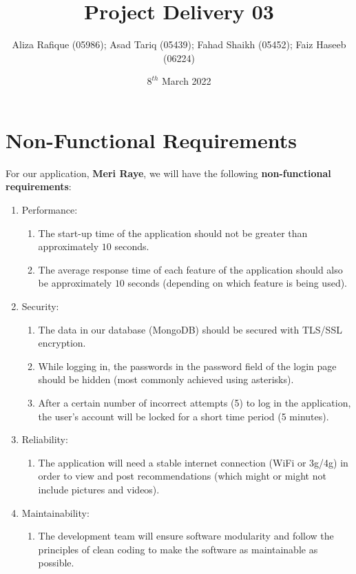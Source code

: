 \documentclass[11pt]{extarticle}
\title{\textbf{Project Delivery 03}}
\author{Aliza Rafique (05986); Asad Tariq (05439); Fahad Shaikh (05452); Faiz Haseeb (06224)}
\date{$8^{th}$ March 2022}
\begin{document}

\newpage
\thispagestyle{empty}
\tableofcontents
\newpage
\pagestyle{plain}

\section{Non-Functional Requirements}
\justify
For our application, \textbf{Meri Raye}, we will have the following \textbf{non-functional requirements}:

\begin{enumerate}
    \item Performance:
                    \begin{enumerate}[label=(\alph*)]
                        \item The start-up time of the application should not be greater than approximately $10$ seconds.
                        \item The average response time of each feature of the application should also be approximately $10$ seconds (depending on which feature is being used).
                    \end{enumerate}
    \item Security:
                    \begin{enumerate}[label=(\alph*)]
                        \item The data in our database (MongoDB) should be secured with TLS/SSL encryption.
                        \item While logging in, the passwords in the password field of the login page should be hidden (most commonly achieved using asterisks).
                        \item After a certain number of incorrect attempts (5) to log in the application, the user's account will be locked for a short time period (5 minutes).
                    \end{enumerate}
    \item Reliability:
                    \begin{enumerate}[label=(\alph*)]
                        \item The application will need a stable internet connection (WiFi or 3g/4g) in order to view and post recommendations (which might or might not include pictures and videos).
                    \end{enumerate}
    \item Maintainability:
                    \begin{enumerate}
                        \item The development team will ensure software modularity and follow the principles of clean coding to make the software as maintainable as possible.

\end{enumerate}
\end{enumerate}
\end{document}

